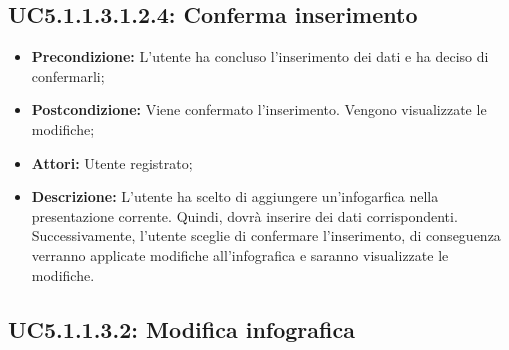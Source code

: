 \subsection{ UC5.1.1.3.1.2.4: Conferma inserimento}

\begin{itemize}
	\item \textbf{Precondizione:} L'utente ha concluso l'inserimento dei dati e ha deciso di confermarli;
	\item \textbf{Postcondizione:} Viene confermato l'inserimento. Vengono visualizzate le modifiche;
	\item \textbf{Attori:} Utente registrato;
	\item \textbf{Descrizione:} L'utente ha scelto di aggiungere un'infogarfica nella presentazione corrente. Quindi, dovrà inserire dei dati corrispondenti. Successivamente, l'utente sceglie di confermare l'inserimento, di conseguenza verranno applicate modifiche all'infografica e saranno visualizzate le modifiche.
\end{itemize}
\subsection{ UC5.1.1.3.2: Modifica infografica}

